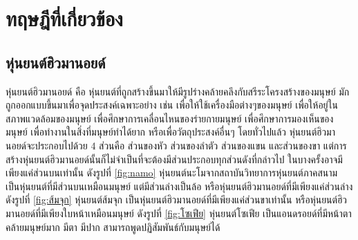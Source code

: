 \section{ทฤษฎีที่เกี่ยวข้อง}
\subsection{หุ่นยนต์ฮิวมานอยด์}
หุ่นยนต์ฮิวมานอยด์ คือ หุ่นยนต์ที่ถูกสร้างขึ้นมาให้มีรูปร่างคล้ายคลึงกับสรีระโครงสร้างของมนุษย์
มักถูกออกแบบขึ้นมาเพื่อจุดประสงค์เฉพาะอย่าง เช่น เพื่อให้ใช้เครื่องมือต่างๆของมนุษย์ เพื่อให้อยู่ในสภาพแวดล้อมของมนุษย์
เพื่อศึกษาการเคลื่อนไหนของร่ายกายมนุษย์ เพื่อศึกษาการมองเห็นของมนุษย์ เพื่อทำงานในสิ่งที่มนุษย์ทำได้ยาก
หรือเพื่อวัตถุประสงค์อื่นๆ โดยทั่วไปแล้ว หุ่นยนต์ฮิวมานอยด์จะประกอบไปด้วย 4 ส่วนคือ ส่วนของหัว ส่วนของลำตัว ส่วนของแขน
และส่วนของขา แต่การสร้างหุ่นยนต์ฮิวมานอยด์นั้นก็ไม่จำเป็นที่จะต้องมีส่วนประกอบทุกส่วนดังที่กล่าวไป
ในบางครั้งอาจมีเพียงแค่ส่วนบนเท่านั้น ดังรูปที่ \ref{fig:namo} หุ่นยนต์นะโมจากสถาบันวิทยาการหุ่นยนต์ภาคสนาม
เป็นหุ่นยนต์ที่มีส่วนบนเหมือนมนุษย์ แต่มีส่วนล่างเป็นล้อ หรือหุ่นยนต์ฮิวมานอยด์ที่มีเพียงแค่ส่วนล่าง ดังรูปที่ \ref{fig:ส้มจุก}
หุ่นยนต์ส้มจุก เป็นหุ่นยนต์ฮิวมานอยด์ที่มีเพียงแค่ส่วนขาเท่านั้น หรือหุ่นยนต์ฮิวมานอยด์ที่มีเพียงใบหน้าเหมือนมนุษย์ ดังรูปที่
\ref{fig:โซเฟีย} หุ่นยนต์โซเฟีย เป็นแอนดรอยด์ที่มีหน้าตาคล้ายมนุษย์มาก มีตา มีปาก สามารถพูดปฏิสัมพันธ์กับมนุษย์ได้

